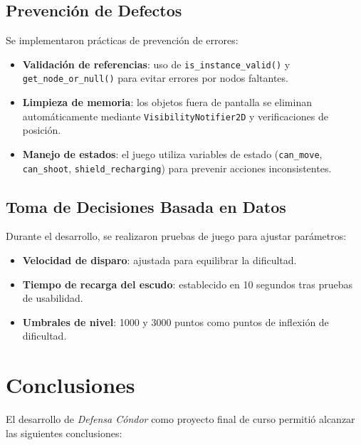 \documentclass[12pt, a4paper, oneside]{report}
\begin{document}
\section{Prevención de Defectos}

Se implementaron prácticas de prevención de errores:
\begin{itemize}
    \item \textbf{Validación de referencias}: uso de \texttt{is\_instance\_valid()} y \texttt{get\_node\_or\_null()} para evitar errores por nodos faltantes.
    \item \textbf{Limpieza de memoria}: los objetos fuera de pantalla se eliminan automáticamente mediante \texttt{VisibilityNotifier2D} y verificaciones de posición.
    \item \textbf{Manejo de estados}: el juego utiliza variables de estado (\texttt{can\_move}, \texttt{can\_shoot}, \texttt{shield\_recharging}) para prevenir acciones inconsistentes.
\end{itemize}

\section{Toma de Decisiones Basada en Datos}

Durante el desarrollo, se realizaron pruebas de juego para ajustar parámetros:
\begin{itemize}
    \item \textbf{Velocidad de disparo}: ajustada para equilibrar la dificultad.
    \item \textbf{Tiempo de recarga del escudo}: establecido en 10 segundos tras pruebas de usabilidad.
    \item \textbf{Umbrales de nivel}: 1000 y 3000 puntos como puntos de inflexión de dificultad.
\end{itemize}

\newpage

\chapter{Conclusiones}

El desarrollo de \textit{Defensa Cóndor} como proyecto final de curso permitió alcanzar las siguientes conclusiones:
\end{document}
